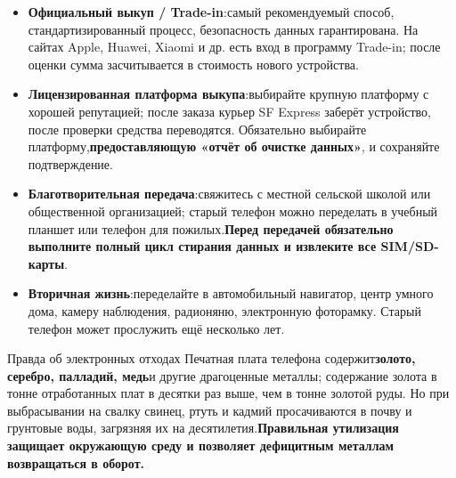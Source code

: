 \begin{itemize}
  \item \textbf{Официальный выкуп / Trade-in}:самый рекомендуемый способ, стандартизированный процесс, безопасность данных гарантирована. На сайтах Apple, Huawei, Xiaomi и др. есть вход в программу Trade-in; после оценки сумма засчитывается в стоимость нового устройства.
  \item \textbf{Лицензированная платформа выкупа}:выбирайте крупную платформу с хорошей репутацией; после заказа курьер SF Express заберёт устройство, после проверки средства переводятся. Обязательно выбирайте платформу,\textbf{предоставляющую «отчёт об очистке данных»}, и сохраняйте подтверждение.
  \item \textbf{Благотворительная передача}:свяжитесь с местной сельской школой или общественной организацией; старый телефон можно переделать в учебный планшет или телефон для пожилых.\textbf{Перед передачей обязательно выполните полный цикл стирания данных и извлеките все SIM/SD-карты}.
  \item \textbf{Вторичная жизнь}:переделайте в автомобильный навигатор, центр умного дома, камеру наблюдения, радионяню, электронную фоторамку. Старый телефон может прослужить ещё несколько лет.
\end{itemize}

\begin{tcbinfo}{Правда об электронных отходах}
Печатная плата телефона содержит\textbf{золото, серебро, палладий, медь}и другие драгоценные металлы; содержание золота в тонне отработанных плат в десятки раз выше, чем в тонне золотой руды. Но при выбрасывании на свалку свинец, ртуть и кадмий просачиваются в почву и грунтовые воды, загрязняя их на десятилетия.\textbf{Правильная утилизация защищает окружающую среду и позволяет дефицитным металлам возвращаться в оборот.}

\end{tcbinfo}

